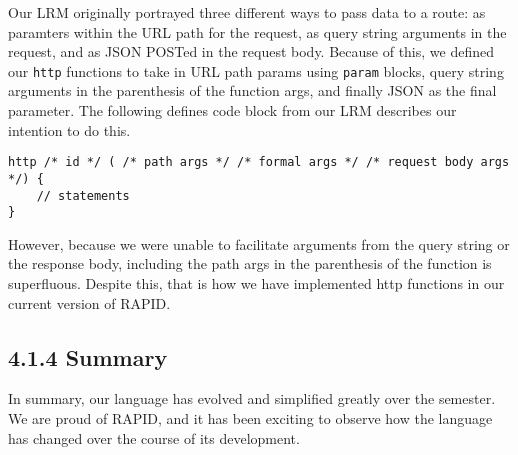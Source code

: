 Our LRM originally portrayed three different ways to pass data to a route: as
paramters within the URL path for the request, as query string arguments in the
request, and as JSON POSTed in the request body.  Because of this, we defined
our \texttt{http} functions to take in URL path params using \texttt{param}
blocks, query string arguments in the parenthesis of the function args, and
finally JSON as the final parameter.  The following defines code block from
our LRM describes our intention to do this.

\begin{verbatim}
http /* id */ ( /* path args */ /* formal args */ /* request body args */) {
    // statements
}
\end{verbatim}

However, because we were unable to facilitate arguments from the query string
or the response body, including the path args in the parenthesis of the function
is superfluous.  Despite this, that is how we have implemented http functions in
our current version of RAPID.

\subsection*{4.1.4 Summary}

In summary, our language has evolved and simplified greatly over the semester.
We are proud of RAPID, and it has been exciting to observe how the language has
changed over the course of its development.
